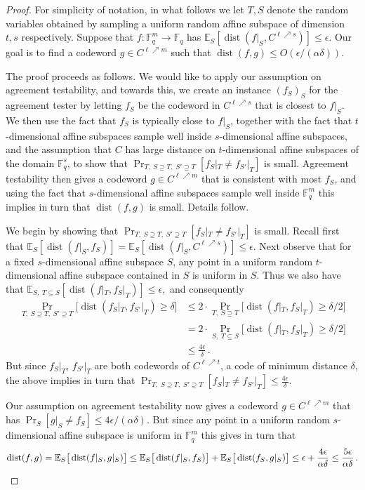 \documentclass{toc}
\theoremstyle{plain}
\DeclareMathOperator{\dist}{dist} %
\newcommand{\E}{{\mathbb{E}}}
\newcommand{\F}{{\mathbb{F}}}
\begin{document}
\begin{proof}
For simplicity of notation, in what follows we let $T, S$ denote the random variables obtained by sampling a uniform random affine subspace of dimension $t, s$ respectively.
Suppose that $f:\F_q^m \to \F_q$ has $\E_{S}[\dist(f|_S, C^{\ell \nearrow s})] \leq \epsilon$.
Our goal is to find a codeword $g \in C^{\ell \nearrow m}$ such that
$\dist(f,g)\leq O(\epsilon / (\alpha \delta))$.

The proof proceeds as follows.
We would like to apply our assumption on agreement testability, and towards this, we create an instance $(f_S)_S$ for the agreement tester by letting $f_S$ be the codeword in $C^{\ell \nearrow s}$ that is closest to $f|_S$. We then use the fact that $f_S$ is typically close to $f|_S$, together with the
fact that $t$-dimensional affine subspaces sample well inside $s$-dimensional affine subspaces, and the assumption that $C$
has large distance  %
on $t$-dimensional affine subspaces
of the domain $\F_q^s$,   %
%
to show that  
$\Pr_{T,\;S\supseteq T, \; S' \supseteq T}[f_S|_T \neq f_{S'}|_T]$ is small.
 Agreement testability then gives a codeword $g \in C^{\ell \nearrow m}$ that is consistent with most $f_S$, and using the fact that $s$-dimensional affine subspaces sample well inside $\F_q^m$ this implies in turn that $\dist(f,g)$ is small. Details follow.


We begin by showing that
$\Pr_{T, \; S \supseteq T, \; S' \supseteq T}[f_S|_T \neq f_{ S'}|_T]$  is small.
Recall first that $\E_S[\dist(f|_S, f_S)] =  \E_{S}[\dist(f|_S, C^{\ell \nearrow s})]\leq  \epsilon$. Next observe that for a fixed $s$-dimensional affine subspace $S$, any point in a uniform random $t$-dimensional affine subspace contained in $S$ is uniform in $S$. Thus we also have that
$\E_{S,\; T \subseteq S}[\dist(f|_T, f_S|_T)] \leq \epsilon,$ and consequently
\begin{align*}
 \Pr_{T, \; S \supseteq T, \; S' \supseteq T}\big[\dist(f_S|_T, f_{ S'}|_T) \geq \delta\big]
& \leq  2 \cdot \Pr_{T,\; S \supseteq T}\big[\dist(f|_T, f_S|_T) \geq \delta/2\big] \\
& =  2 \cdot \Pr_{S,\; T \subseteq S}\big[\dist(f|_T, f_S|_T) \geq \delta/2\big] \\
& \leq  \frac{4\epsilon} {\delta}\,.
\end{align*}
But since $f_S|_T$, $f_{S'}|_T$ are both codewords of $C^{\ell \nearrow t}$, a code of %
minimum   %
distance $\delta$, the above implies in turn that $\Pr_{T, \; S \supseteq T, \; S' \supseteq T}[f_S|_T \neq f_{ S'}|_T] \leq \frac{4\epsilon} {\delta}.$

Our assumption on agreement testability now gives a codeword $g \in C^{\ell \nearrow m}$ that has $\Pr_S[g|_S \neq f_S] \leq 4\epsilon/(\alpha \delta).$ But since any point in a uniform random $s$-dimensional affine subspace is uniform in $\F_q^m$ this gives in turn that
\[\dist(f,g) =\E_S\big[\dist(f|_S, g|_S)\big] \leq
  \E_S\big[\dist(f|_S, f_S)\big] + \E_S\big[\dist(f_S, g|_S)\big] \leq
  \epsilon +\frac{4\epsilon} {\alpha \delta} \leq \frac {5 \epsilon}
  {\alpha \delta} \,. \qedhere \]

\end{proof}
\end{document}
